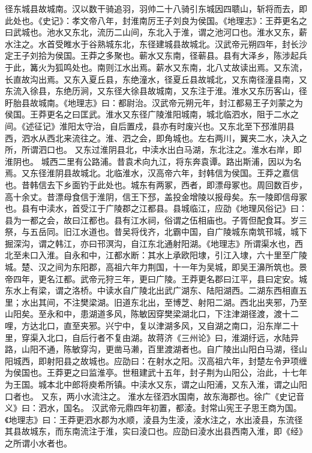 \documentclass[12pt,UTF8]{ctexbook}
\begin{document}
径东城县故城南。汉以数干骑追羽，羽帅二十八骑引东城因四聩山，斩将而去，即此处也。《史记》：孝文帝八年，封淮南厉王子刘良为侯国。《地理志》：王莽更名之曰武城也。池水又东北，流历二山间，东北入于淮，谓之池河口也。淮水又东，薪水注之。水首受睢水于谷熟城东北，东径建城县故城北。汉武帝元朔四年，封长沙定王子刘拾为侯国。王莽之多聚也。蕲水又东南，径蕲县。县有大泽乡，陈涉起兵于此，篝火为狐鸣处也。南则江水出焉。薪水又东南，北八丈故读出焉。又东流，长直故沟出焉。又东入夏丘县，东绝潼水，径夏丘县故城北，又东南径潼县南，又东流入徐县，东绝历涧，又东径大徐县故城南，又东注于淮。淮水又东历客山，径盱胎县故城南。《地理志》曰：都尉治。汉武帝元朔元年，封江都易王子刘蒙之为侯国。王莽更名之曰匡武。淮水又东径广陵淮阳城南，城北临泗水，阻于二水之间。《述征记》淮阳太守治，自后置戍，县亦有时废兴也。又东北至下邳淮阴县西，泗水从西北来流往之。淮、泗之会，即角城也。左右两川，翼夹二水，决入之所，所谓泗口也。
又东过淮阴县北，中渎水出白马湖，东北注之。淮水右岸，即淮阴也。
城西二里有公路浦。昔袁术向九江，将东奔袁谭。路出斯浦，因以为名焉。又东径淮阴县故城北。北临淮水，汉高帝六年，封韩信为侯国。王莽之嘉信也。昔韩信去下乡面钓于此处也。城东有两冢，西者，即漂母冢也。周回数百步，高十余丈。昔漂母食信于淮阴，信王下邳，盖投金增陵以报母矣。东一陵即信母冢也。县有中渎水，首受江于广陵郡之江都县。县城临江，应劭《地理风俗记》曰：县为一都之会，故曰江都也。县有江水祠，俗谓之伍相庙也。子胥但配食耳。岁三祭，与五岳同。旧江水道也。昔吴将伐齐，北霸中国，自广陵城东南筑邗城，城下掘深沟，谓之韩江，亦曰邗溟沟，自江东北通射阳湖。《地理志》所谓渠水也，西北至未口入淮。自永和中，江都水断：其水上承欧阳埭，引江入埭，六十里至广陵城。楚、汉之间为东阳郡，高祖六年力荆国，十一年为吴城，即吴王濞所筑也。景帝四年，更名江都。武帝元狩三年，更曰广陵。王莽更名郡曰江平，县曰定安。城东水上有梁，谓之洛桥。中读水自广陵北出武广湖东、陆阳湖西。二湖东西相直五里；水出其间，不注樊梁湖。旧道东北出，至博芝、射阳二湖。西北出夹邪，乃至山阳矣。至永和中，患湖道多风，陈敏因穿樊梁湖北口，下注津湖径渡，渡十二哩，方达北口，直至夹邪。兴宁中，复以津湖多风，又自湖之南口，沿东岸二十里，穿渠入北口，自后行者不复由湖。故蒋济《三州论》曰，淮湖纡远，水陆异路，山阳不通，陈敏穿沟，更凿马濑，百里渡湖者也。自广陵出山阳白马湖，径山阳城西，即射阳县之故城也。应劭曰：在射水之阳。汉高祖六年，封楚左令尹项缠为侯国也。王莽更之曰监淮亭。世租建武十五年，封子荆为山阳公，治此，十七年为王国。城本北中郎将庾希所镇。中渎水又东，谓之山阳浦，又东入淮，谓之山阳口者也。
又东，两小水流注之。
淮水左径泗水国南，故东海郡也。徐广《史记音义》曰：泗水，国名。
汉武帝元鼎四年初置，都淩。封常山宪王子思王商为国。《地理志》曰：王莽更泗水郡为水顺，淩县为生淩，淩水注之，水出淩县，东流径其县故城东，而东南流注于淮，实曰淩口也。应劭曰淩水出县西南入淮，即《经》之所谓小水者也。
\end{document}
